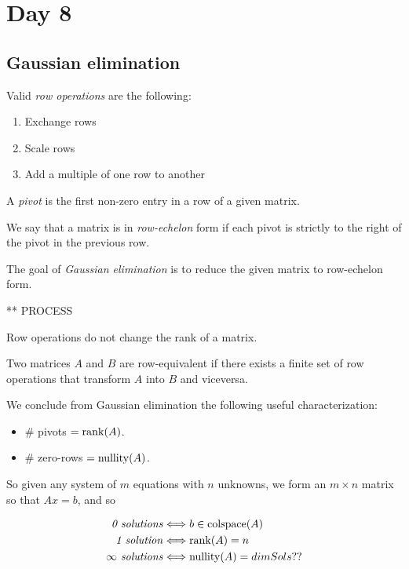 
\pagebreak
\section{Day 8}

\subsection{Gaussian elimination}

Valid \emph{row operations} are the following:
\begin{enumerate}[(1)]
  \item Exchange rows
  \item Scale rows
  \item Add a multiple of one row to another
\end{enumerate}

A \emph{pivot} is the first non-zero entry in a row of a given matrix.

\begin{definition}
  We say that a matrix is in \emph{row-echelon} form if each pivot is strictly to the right of the pivot in the previous row.
\end{definition}

The goal of \emph{Gaussian elimination} is to reduce the given matrix to row-echelon form.

** PROCESS

\begin{lemma}
  Row operations do not change the rank of a matrix.
\end{lemma}

\begin{definition}
  Two matrices $A$ and $B$ are row-equivalent if there exists a finite set of row operations that transform $A$ into $B$ and viceversa.
\end{definition}

We conclude from Gaussian elimination the following useful characterization:
\begin{itemize}
  \item \# pivots $= \operatorname{rank}(A)$.
  \item \# zero-rows $= \operatorname{nullity}(A)$.
\end{itemize}

So given any system of $m$ equations with $n$ unknowns, we form an $m\times n$ matrix so that $Ax=b$, and so

\begin{align*}
  \text{\emph{0 solutions}} &\Longleftrightarrow b\in \text{colspace}(A)\\
  \text{\emph{1 solution}} &\Longleftrightarrow \operatorname{rank}(A)=n\\
  \text{\emph{$\infty$ solutions}} &\Longleftrightarrow \operatorname{nullity}(A)=dim Sols??
\end{align*}

